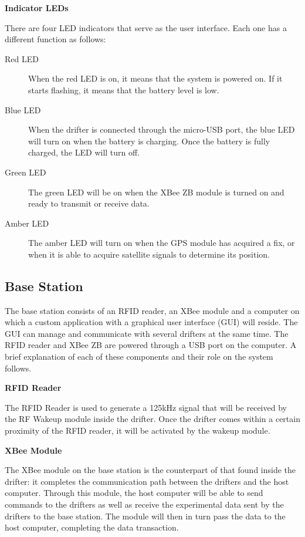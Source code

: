 \noindent\textbf{Indicator LEDs}

There are four LED indicators that serve as the user interface.  Each one has a different function as follows:
\vspace{-12pt}
\begin{description}
\item[Red LED] When the red LED is on, it means that the system is powered on.  If it starts flashing, it means that the battery level is low.

\item[Blue LED] When the drifter is connected through the micro-USB port, the blue LED will turn on when the battery is charging.  Once the battery is fully charged, the LED will turn off.

\item[Green LED] The green LED will be on when the XBee ZB module is turned on and ready to transmit or receive data.

\item[Amber LED] The amber LED will turn on when the GPS module has acquired a fix, or when it is able to acquire satellite signals to determine its position.
\end{description}

\subsection{Base Station}
The base station consists of an RFID reader, an XBee module and a computer on which a custom application with a graphical user interface (GUI) will reside.  The GUI can manage and communicate with several drifters at the same time. The RFID reader and XBee ZB are powered through a USB port on the computer.  A brief explanation of each of these components and their role on the system follows.

\noindent\textbf{RFID Reader}

The RFID Reader is used to generate a 125kHz signal that will be received by the RF Wakeup module inside the drifter.  Once the drifter comes within a certain proximity of the RFID reader, it will be activated by the wakeup module.

\noindent\textbf{XBee Module}

The XBee module on the base station is the counterpart of that found inside the drifter: it completes the communication path between the drifters and the host computer.  Through this module, the host computer will be able to send commands to the drifters as well as receive the experimental data sent by the drifters to the base station.  The module will then in turn pass the data to the host computer, completing the data transaction.

